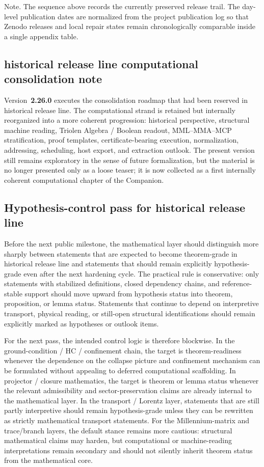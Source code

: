 \documentclass[12pt,a4paper]{article}
\DeclareRobustCommand{\QSCver}[1]{archival stage}
\renewcommand{\QSCver}[1]{historical release line}
\begin{document}
\noindent Note. The sequence above records the currently preserved release trail.
The day-level publication dates are normalized from the project publication log so that
Zenodo releases and local repair states remain chronologically comparable inside a single
appendix table.


\subsection*{\QSCver{v2.26.0} computational consolidation note}

Version~\textbf{2.26.0} executes the consolidation roadmap that had been reserved in
\QSCver{v2.25.1}. The computational strand is retained but internally reorganized into a more
coherent progression: historical perspective, structural machine reading, Triolen
Algebra / Boolean readout, MML--MMA--MCP stratification, proof templates,
certificate-bearing execution, normalization, addressing, scheduling, host export,
and extraction outlook. The present version still remains exploratory in the sense of
future formalization, but the material is no longer presented only as a loose teaser;
it is now collected as a first internally coherent computational chapter of the
Companion.



\subsection*{Hypothesis-control pass for \QSCver{v2.27.0}}

Before the next public milestone, the mathematical layer should distinguish more sharply between statements that are expected to become theorem-grade in \QSCver{v2.27.0} and statements that should remain explicitly hypothesis-grade even after the next hardening cycle. The practical rule is conservative: only statements with stabilized definitions, closed dependency chains, and reference-stable support should move upward from hypothesis status into theorem, proposition, or lemma status. Statements that continue to depend on interpretive transport, physical reading, or still-open structural identifications should remain explicitly marked as hypotheses or outlook items.

For the next pass, the intended control logic is therefore blockwise. In the ground-condition / HC / confinement chain, the target is theorem-readiness whenever the dependence on the collapse picture and confinement mechanism can be formulated without appealing to deferred computational scaffolding. In projector / closure mathematics, the target is theorem or lemma status whenever the relevant admissibility and sector-preservation claims are already internal to the mathematical layer. In the transport / Lorentz layer, statements that are still partly interpretive should remain hypothesis-grade unless they can be rewritten as strictly mathematical transport statements. For the Millennium-matrix and trace/branch layers, the default stance remains more cautious: structural mathematical claims may harden, but computational or machine-reading interpretations remain secondary and should not silently inherit theorem status from the mathematical core.
\end{document}
